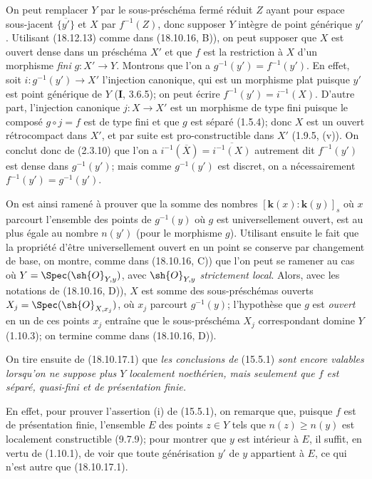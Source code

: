 On peut remplacer $Y$ par le sous-préschéma fermé réduit $Z$ ayant pour espace sous-jacent $\overline{\{y'\}}$ et $X$ par $f^{-1}(Z)$, donc supposer $Y$ intègre de point générique $y'$. Utilisant (18.12.13) comme dans (18.10.16, B)), on peut supposer que $X$ est ouvert dense dans un préschéma $X'$ et que $f$ est la restriction à $X$ d'un morphisme \emph{fini} $g:X'\to Y$. Montrons que l'on a $g^{-1}(y')=f^{-1}(y')$. En effet, soit $i:g^{-1}(y')\to X'$ l'injection canonique, qui est un morphisme plat puisque $y'$ est point générique de $Y$ (\textbf{I}, 3.6.5); on peut écrire $f^{-1}(y')=i^{-1}(X)$. D'autre part, l'injection canonique $j:X\to X'$ est un morphisme de type fini puisque le composé $g\circ j=f$ est de type fini et que $g$ est séparé (1.5.4); donc $X$ est un ouvert rétrocompact dans $X'$, et par suite est pro-constructible dans $X'$ (1.9.5, (v)). On conclut donc de (2.3.10) que l'on a $i^{-1}(\overline{X})=\overline{i^{-1}(X)}$ autrement dit $f^{-1}(y')$ est dense dans $g^{-1}(y')$; mais comme $g^{-1}(y')$ est discret, on a nécessairement $f^{-1}(y')=g^{-1}(y')$.

On est ainsi ramené à prouver que la somme des nombres $[\boldsymbol{k}(x):\boldsymbol{k}(y)]_s$ où $x$ parcourt l'ensemble des points de $g^{-1}(y)$ où $g$ est universellement ouvert, est au plus égale
au nombre $n(y')$ (pour le morphisme $g$). Utilisant ensuite le fait que la propriété d'être universellement ouvert en un point se conserve par changement de base, on montre, comme dans (18.10.16, C)) que l'on peut se ramener au cas où $Y=\Spec(\sh{O}_{Y,y})$, avec $\sh{O}_{Y,y}$ \emph{strictement local}. Alors, avec les notations de (18.10.16, D)), $X$ est somme des sous-préschémas ouverts $X_j=\Spec(\sh{O}_{X,x_j})$, où $x_j$ parcourt $g^{-1}(y)$; l'hypothèse que $g$ est \emph{ouvert} en un de ces points $x_j$ entraîne que le sous-préschéma $X_j$ correspondant domine $Y$ (1.10.3); on termine comme dans (18.10.16, D)).

On tire ensuite de (18.10.17.1) que \emph{les conclusions de} (15.5.1) \emph{sont encore valables lorsqu'on ne suppose plus $Y$ localement noethérien, mais seulement que $f$ est séparé, quasi-fini et de présentation finie.}

En effet, pour prouver l'assertion (i) de (15.5.1), on remarque que, puisque $f$ est de présentation finie, l'ensemble $E$ des points $z\in Y$ tels que $n(z)\geq n(y)$ est localement constructible (9.7.9); pour montrer que $y$ est intérieur à $E$, il suffit, en vertu de (1.10.1), de voir que toute générisation $y'$ de $y$ appartient à $E$, ce qui n'est autre que (18.10.17.1).

